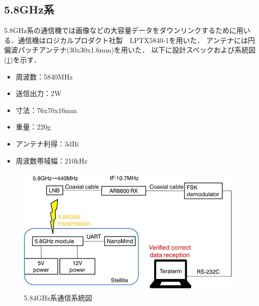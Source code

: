 \subsection{5.8GHz系}
5.8GHz系の通信機では画像などの大容量データをダウンリンクするために用いる．通信機はロジカルプロダクト社製　LPTX5840-1を用いた．
アンテナには円偏波パッチアンテナ(30x30x1.6mm)を用いた．
以下に設計スペックおよび系統図(\ref{fig4-2-4})を示す．
\begin{itemize}
	\item 周波数：5840MHz
	\item 送信出力：2W
	\item 寸法：76x70x16mm
	\item 重量：220g
	\item アンテナ利得：3dBi
	\item 周波数帯域幅：210kHz
\end{itemize}
\begin{figure}[H]
	\centering
	\includegraphics[scale=0.6]{03/fig/4-2-4.jpg}
	\caption{5.84GHz系通信系統図}
	\label{fig4-2-4}
\end{figure}
